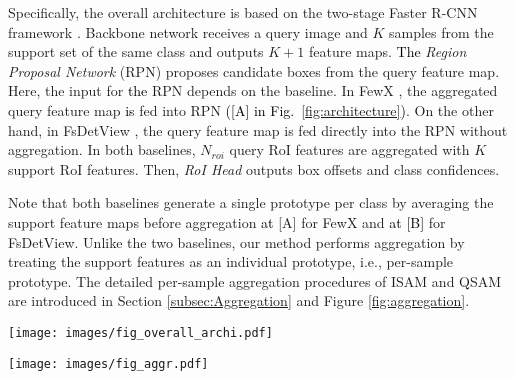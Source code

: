 \documentclass[10pt,twocolumn,letterpaper]{article}
\newcommand{\nj}[1]{\textcolor{black}{#1}}
\newcommand{\hj}[1]{\textcolor{black}{#1}}
\begin{document}
Specifically, the overall architecture is based on the two-stage Faster R-CNN framework \cite{ren2015faster}. Backbone network receives a query image and $K$ samples from the support set of the same class and outputs $K+1$ feature maps. \nj{The} \textit{Region Proposal Network} (RPN) proposes candidate boxes from the query feature map. Here, the input for \nj{the} RPN depends on the baseline. In FewX \cite{fan2020fsod}, the aggregated query feature map \hj{is} fed into RPN \nj{([A] in Fig.~\ref{fig:architecture})}. On the other hand, in FsDetView \cite{xiao2020few}, the query feature map is fed directly into the RPN without aggregation. In both baselines, $N_{roi}$ query RoI features are aggregated with $K$ support RoI features. Then, \textit{RoI Head} outputs box offsets and class confidences. 

Note that both baselines \cite{fan2020fsod, xiao2020few} generate a single prototype per class by averaging the support feature maps before aggregation \nj{at} [A] for FewX and \nj{at [B]} for FsDetView. Unlike the two baselines, our method performs aggregation by treating the support features as an individual prototype, i.e., per-sample prototype. The detailed per-sample aggregation procedures of ISAM and QSAM are introduced in Section \ref{subsec:Aggregation} and Figure \ref{fig:aggregation}.


\begin{figure*}
\centering
\texttt{[image: images/fig\_overall\_archi.pdf]}
\vspace{-0.1cm}
\caption{\textbf{\nj{Our} overall Architecture} based on Faster R-CNN \cite{ren2015faster} to find instances of support category in the query image. [A] and [B] are aggregation procedure (Fig. \ref{fig:aggregation}) for the query feature and the support features. Baselines are FewX \cite{fan2020fsod} and FsDetView \cite{xiao2020few}, where FewX has both [A] and [B] operations, and in FsDetView, query features are directly fed into RPN without aggregation of [A] operation.}

\label{fig:architecture}
\end{figure*}


\begin{figure*}
\centering
\texttt{[image: images/fig\_aggr.pdf]}
\vspace{-0.1cm}
\caption{Two types of aggregation procedures (3-shot example) of the query feature maps and $K$ support feature maps. (a) is for spatial attention to the query feature map and (b) is for aggregation of $N_{roi}$ query feature maps and $K$ support feature maps.}
\label{fig:aggregation}
\end{figure*}
\end{document}
